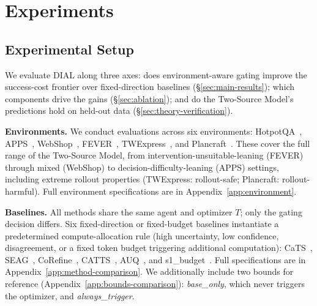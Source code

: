 \vspace{-0.1in}
\section{Experiments}
\label{sec:experiments}
\vspace{-0.1in}
\subsection{Experimental Setup}
\label{sec:exp-setup}

We evaluate DIAL along three axes: does environment-aware gating improve the success-cost
frontier over fixed-direction baselines
(\S\ref{sec:main-results}); which components drive the gains
(\S\ref{sec:ablation}); and do the Two-Source Model's predictions
hold on held-out data (\S\ref{sec:theory-verification}).

\textbf{Environments.} We conduct evaluations across six environments: 
HotpotQA~\cite{yang2018hotpotqa},
APPS~\cite{hendrycks2021apps},
WebShop~\cite{yao2022webshop},
FEVER~\cite{thorne2018fever},
TWExpress~\cite{jansen2023twexpress}, and
Plancraft~\cite{dagan2024plancraft}. 
These cover the full range of the Two-Source
Model, from intervention-unsuitable-leaning (FEVER) through mixed (WebShop) to decision-difficulty-leaning (APPS) settings, including extreme rollout properties
(TWExpress: rollout-safe; Plancraft: rollout-harmful).
Full environment specifications are in
Appendix~\ref{app:environment}.

\vspace{-0.025in}
\textbf{Baselines.} All methods share the same agent and
optimizer $T$; only the gating decision differs.
Six fixed-direction or fixed-budget baselines instantiate a
predetermined compute-allocation rule (high uncertainty, low
confidence, disagreement, or a fixed token budget triggering
additional computation):
CaTS~\cite{cats2025}, SEAG~\cite{seag2025},
CoRefine~\cite{corefine2026}, CATTS~\cite{catts2026},
AUQ~\cite{auq2026}, and s1\_budget~\cite{s1_2025}. Full specifications are in Appendix~\ref{app:method-comparison}. We additionally include two bounds for reference (Appendix~\ref{app:bounds-comparison}): \emph{base\_only}, which never triggers
the optimizer, and \emph{always\_trigger}.


